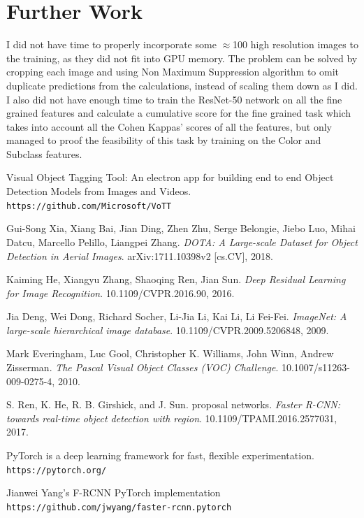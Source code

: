 \documentclass[]{article}
\begin{document}
\section{Further Work}
I did not have time to properly incorporate some $\approx$100 high resolution images to the training, as they did not fit into GPU memory. 
The problem can be solved by cropping each image and using Non Maximum Suppression algorithm to omit duplicate predictions from the calculations, instead of scaling them down as I did.
\\
I also did not have enough time to train the ResNet-50 network on all the fine grained features and calculate a cumulative score for the fine grained task which takes into account all the Cohen Kappas' scores of all the features, but only managed to proof the feasibility of this task by training on the Color and Subclass features.

\begin{thebibliography}{9}
	Visual Object Tagging Tool: An electron app for building end to end Object Detection Models from Images and Videos.
	\\\texttt{https://github.com/Microsoft/VoTT}
	
	Gui-Song Xia, Xiang Bai, Jian Ding, Zhen Zhu, Serge Belongie, Jiebo Luo, Mihai Datcu, Marcello Pelillo, Liangpei Zhang.
	\textit{DOTA: A Large-scale Dataset for Object Detection in Aerial Images}. 
	arXiv:1711.10398v2 [cs.CV], 2018.
	
	Kaiming He, Xiangyu Zhang, Shaoqing Ren, Jian Sun.
	\textit{Deep Residual Learning for Image Recognition}. 
	10.1109/CVPR.2016.90, 2016.
	
	 Jia Deng, Wei Dong, Richard Socher, Li-Jia Li, Kai Li, Li Fei-Fei.
	\textit{ImageNet: A large-scale hierarchical image database}. 
	10.1109/CVPR.2009.5206848, 2009.
	
	Mark Everingham, Luc Gool, Christopher K. Williams, John Winn, Andrew Zisserman.
	\textit{The Pascal Visual Object Classes (VOC) Challenge}. 
	10.1007/s11263-009-0275-4, 2010.
	
	S. Ren, K. He, R. B. Girshick, and J. Sun.
	proposal networks.
	\textit{Faster R-CNN: towards real-time object detection with region}. 
	10.1109/TPAMI.2016.2577031, 2017.
	
	PyTorch is a deep learning framework for fast, flexible experimentation.
	\\\texttt{https://pytorch.org/}
	
	Jianwei Yang's F-RCNN PyTorch implementation
	\\\texttt{https://github.com/jwyang/faster-rcnn.pytorch}
	
\end{thebibliography}
\end{document}

